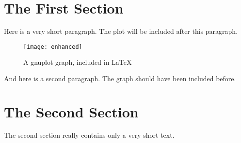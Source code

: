 \documentclass{article}
\begin{document}
\section{The First Section}

Here is a very short paragraph. The plot will be included 
after this paragraph.

\begin{figure}[h]
  \begin{center}
    \texttt{[image: enhanced]}
  \end{center}
  \caption{A gnuplot graph, included in \LaTeX}
\end{figure}

And here is a second paragraph. The graph should have
been included before.

\section{The Second Section}

The second section really contains only a very short text.
\end{document}
